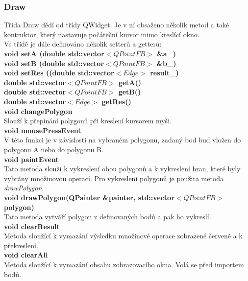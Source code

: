 \documentclass[a4paper,11pt,twoside]{article}
\begin{document}
\subsubsection{Draw}
Třída Draw dědí od třídy QWidget. Je v ní obsaženo několik metod a také kontruktor, který nastavuje počáteční kursor mimo kreslící okno.\\

\noindent Ve třídě je dále definováno několik setterů a getterů:\\
\noindent\textbf{void setA (double std::vector$<QPointFB>$ \&a\_)}\\
\noindent\textbf{void setB (double std::vector$<QPointFB>$ \&b\_)}\\
\noindent\textbf{void setRes ((double std::vector$<Edge>$ result\_)}\\
\noindent\textbf{double std::vector$<QPointFB>$ getA()}\\
\noindent\textbf{double std::vector$<QPointFB>$ getB()}\\
\noindent\textbf{double std::vector$<Edge>$ getRes()}\\

\noindent\textbf{void changePolygon}\\
Slouží k přepínání polygonů při kreslení kursorem myši.\\

\noindent\textbf{void mousePressEvent}\\
V této funkci je v závislosti na vybraném polygonu, zadaný bod buď vložen do polygonu A nebo do polygonu B.\\

\noindent\textbf{void paintEvent}\\
Tato metoda slouží k vykreslení obou polygonů a k vykreslení hran, které byly vybrány množinovou operací. Pro vykreslení polygonů je použita metoda \textit{drawPolygon}.\\

\noindent\textbf{void drawPolygon(QPainter \&painter, std::vector$<QPointFB>$ polygon)}\\
Tato metoda vytváří polygon z definovaných bodů a pak ho vykreslí.\\

\newpage
\vspace*{-1cm}
\noindent\textbf{void clearResult}\\
Metoda sloužící k vymazání výsledku množinové operace zobrazené červeně a k překreslení.  \\

\noindent\textbf{void clearAll}\\
Metoda sloužící k vymazání obsahu zobrazovacího okna. Volá se před importem bodů.\\
\end{document}
